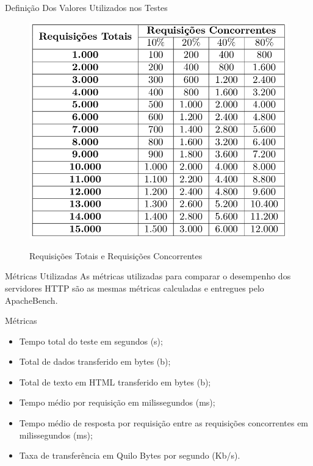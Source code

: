 \begin{frame}{Definição Dos Valores Utilizados nos Testes}
	\begin{figure}
		\centering
		\caption{Requisições Totais e Requisições Concorrentes}
		\includegraphics[width=0.7\linewidth]{tabela-requisicoes} \\
	\end{figure}
\end{frame}

\begin{frame}{Métricas Utilizadas}
As métricas utilizadas para comparar o desempenho dos servidores HTTP são as 
mesmas métricas calculadas e entregues pelo ApacheBench.
\begin{block}{Métricas}
\begin{itemize}
	\item Tempo total do teste em segundos (s);
	\item Total de dados transferido em bytes (b);
	\item Total de texto em HTML transferido em bytes (b);
	\item Tempo médio por requisição em milissegundos (ms);
	\item Tempo médio de resposta por requisição entre as requisições 
	concorrentes em milissegundos (ms);
	\item Taxa de transferência em Quilo Bytes por segundo (Kb/s).
\end{itemize}
\end{block}
\end{frame}





